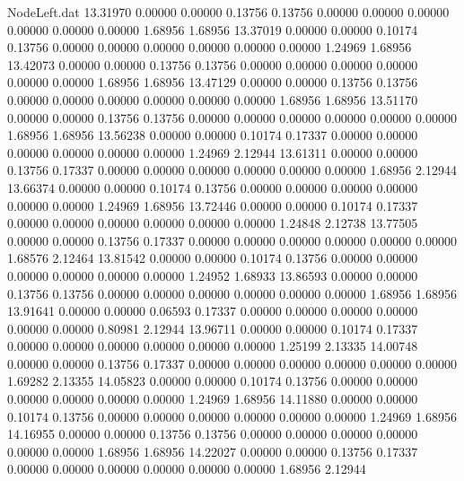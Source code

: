 \begin{filecontents}{NodeLeft.dat}
  13.31970    0.00000    0.00000     0.13756    0.13756    0.00000    0.00000    0.00000    0.00000    0.00000    0.00000    1.68956    1.68956
  13.37019    0.00000    0.00000     0.10174    0.13756    0.00000    0.00000    0.00000    0.00000    0.00000    0.00000    1.24969    1.68956
  13.42073    0.00000    0.00000     0.13756    0.13756    0.00000    0.00000    0.00000    0.00000    0.00000    0.00000    1.68956    1.68956
  13.47129    0.00000    0.00000     0.13756    0.13756    0.00000    0.00000    0.00000    0.00000    0.00000    0.00000    1.68956    1.68956
  13.51170    0.00000    0.00000     0.13756    0.13756    0.00000    0.00000    0.00000    0.00000    0.00000    0.00000    1.68956    1.68956
  13.56238    0.00000    0.00000     0.10174    0.17337    0.00000    0.00000    0.00000    0.00000    0.00000    0.00000    1.24969    2.12944
  13.61311    0.00000    0.00000     0.13756    0.17337    0.00000    0.00000    0.00000    0.00000    0.00000    0.00000    1.68956    2.12944
  13.66374    0.00000    0.00000     0.10174    0.13756    0.00000    0.00000    0.00000    0.00000    0.00000    0.00000    1.24969    1.68956
  13.72446    0.00000    0.00000     0.10174    0.17337    0.00000    0.00000    0.00000    0.00000    0.00000    0.00000    1.24848    2.12738
  13.77505    0.00000    0.00000     0.13756    0.17337    0.00000    0.00000    0.00000    0.00000    0.00000    0.00000    1.68576    2.12464
  13.81542    0.00000    0.00000     0.10174    0.13756    0.00000    0.00000    0.00000    0.00000    0.00000    0.00000    1.24952    1.68933
  13.86593    0.00000    0.00000     0.13756    0.13756    0.00000    0.00000    0.00000    0.00000    0.00000    0.00000    1.68956    1.68956
  13.91641    0.00000    0.00000     0.06593    0.17337    0.00000    0.00000    0.00000    0.00000    0.00000    0.00000    0.80981    2.12944
  13.96711    0.00000    0.00000     0.10174    0.17337    0.00000    0.00000    0.00000    0.00000    0.00000    0.00000    1.25199    2.13335
  14.00748    0.00000    0.00000     0.13756    0.17337    0.00000    0.00000    0.00000    0.00000    0.00000    0.00000    1.69282    2.13355
  14.05823    0.00000    0.00000     0.10174    0.13756    0.00000    0.00000    0.00000    0.00000    0.00000    0.00000    1.24969    1.68956
  14.11880    0.00000    0.00000     0.10174    0.13756    0.00000    0.00000    0.00000    0.00000    0.00000    0.00000    1.24969    1.68956
  14.16955    0.00000    0.00000     0.13756    0.13756    0.00000    0.00000    0.00000    0.00000    0.00000    0.00000    1.68956    1.68956
  14.22027    0.00000    0.00000     0.13756    0.17337    0.00000    0.00000    0.00000    0.00000    0.00000    0.00000    1.68956    2.12944

\end{filecontents}
